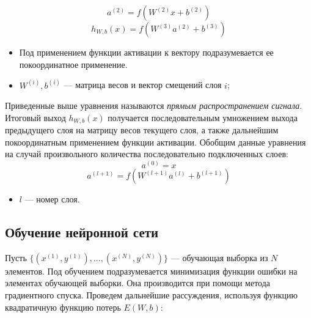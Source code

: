 \documentclass[14pt, a4paper]{extarticle}
\begin{document}
\begin{equation*}
	a^{(2)} = f(W^{(2)}x + b^{(2)})
\end{equation*}
\begin{equation*}
	h_{W, b}(x) = f(W^{(3)}a^{(2)} + b^{(3)})
\end{equation*}
\begin{itemize}
\item Под применением функции активации к вектору подразумевается ее покоординатное применение.
\item $W^{(i)}, b^{(i)}$ — матрица весов и вектор смещений слоя $i$;
\end{itemize}

Приведенные выше уравнения называются \textit{прямым распространением сигнала}. Итоговый выход $h_{W, b}(x)$ получается последовательным умножением выхода предыдущего слоя на матрицу весов текущего слоя, а также дальнейшим покоординатным применением функции активации. Обобщим данные уравнения на случай произвольного количества последовательно подключенных слоев:
\begin{equation*}
	a^{(0)} = x
\end{equation*}
\begin{equation*}
	a^{(l+1)} = f(W^{(l+1)}a^{(l)} + b^{(l+1)})
\end{equation*}
\begin{itemize}
	\item $l$ — номер слоя.
\end{itemize}

\subsection*{Обучение нейронной сети}
Пусть $\{(x^{(1)}, y^{(1)}), ..., (x^{(N)}, y^{(N)})\}$ — обучающая выборка из $N$ элементов. Под обучением подразумевается минимизация функции ошибки на элементах обучающей выборки. Она производится при помощи метода градиентного спуска. Проведем дальнейшие рассуждения, используя функцию квадратичную функцию потерь $E(W, b)$:
\end{document}

